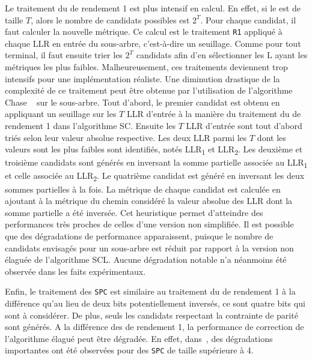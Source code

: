 Le traitement du \noeud de rendement 1 est plus intensif en calcul. En effet, si le \noeud est de taille $T$, alors le nombre de candidats possibles est $2^T$. Pour chaque candidat, il faut calculer la nouvelle métrique. Ce calcul est le traitement \texttt{R1} appliqué à chaque LLR en entrée du sous-arbre, c'est-à-dire un seuillage. Comme pour tout \noeud terminal, il faut ensuite trier les $2^T$ candidats afin d'en sélectionner les $\mathrm{L}$ ayant les métriques les plus faibles. Malheureusement, ces traitements deviennent trop intensifs pour une implémentation réaliste. Une diminution drastique de la complexité de ce traitement peut être obtenue par l'utilisation de l'algorithme \og Chase \fg~\cite{chase_class_1972} sur le sous-arbre. Tout d'abord, le premier candidat est obtenu en appliquant un seuillage sur les $T$ LLR d'entrée à la manière du traitement du \noeud de rendement 1 dans l'algorithme SC. Ensuite les $T$ LLR d'entrée sont tout d'abord triés selon leur valeur absolue respective. Les deux LLR parmi les $T$  dont les valeurs sont les plus faibles sont identifiés, notés LLR\textsubscript{1} et LLR\textsubscript{2}. Les deuxième et troisième candidats sont générés en inversant la somme partielle associée au LLR\textsubscript{1} et celle associée au LLR\textsubscript{2}. Le quatrième candidat est généré en inversant les deux sommes partielles à la fois. La métrique de chaque candidat est calculée en ajoutant à la métrique du chemin considéré la valeur absolue des LLR dont la somme partielle a été inversée. Cet heuristique permet d'atteindre des performances très proches de celles d'une version non simplifiée. Il est possible que des dégradations de performance apparaissent, puisque le nombre de candidats envisagés pour un sous-arbre est réduit par rapport à la version non élaguée de l'algorithme SCL. Aucune dégradation notable n'a néanmoins été observée dans les faits expérimentaux.

 

Enfin, le traitement des \noeuds \texttt{SPC} est similaire au traitement du \noeud de rendement 1 à la différence qu'au lieu de deux bits potentiellement inversés, ce sont quatre bits qui sont à considérer. De plus, seuls les candidats respectant la contrainte de parité sont générés. A la différence des \noeuds de rendement 1, la performance de correction de l'algorithme élagué peut être dégradée. En effet, dans~\cite{sarkis_fast_2016}, des dégradations importantes ont été observées pour des \noeuds \texttt{SPC} de taille supérieure à 4. 


